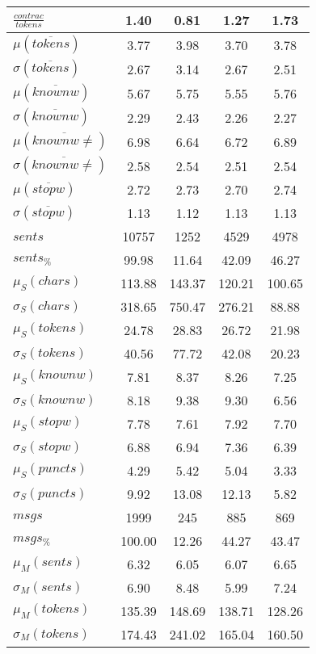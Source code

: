 \begin{table}[h!]
\begin{center}
\begin{tabular}{| l || c | c | c | c |}
$\frac{contrac}{tokens}$ & 1.40  & 0.81  & 1.27  & 1.73 \\\hline\hline
$\mu(\overline{tokens})$ & 3.77  & 3.98  & 3.70  & 3.78 \\
$\sigma(\overline{tokens})$ & 2.67  & 3.14  & 2.67  & 2.51 \\\hline
$\mu(\overline{knownw})$ & 5.67  & 5.75  & 5.55  & 5.76 \\
$\sigma(\overline{knownw})$ & 2.29  & 2.43  & 2.26  & 2.27 \\\hline
$\mu(\overline{knownw \neq})$ & 6.98  & 6.64  & 6.72  & 6.89 \\
$\sigma(\overline{knownw \neq})$ & 2.58  & 2.54  & 2.51  & 2.54 \\\hline
$\mu(\overline{stopw})$ & 2.72  & 2.73  & 2.70  & 2.74 \\
$\sigma(\overline{stopw})$ & 1.13  & 1.12  & 1.13  & 1.13 \\\hline\hline
$sents$ & 10757  & 1252  & 4529  & 4978 \\
$sents_{\%}$ & 99.98  & 11.64  & 42.09  & 46.27 \\\hline
$\mu_S(chars)$ & 113.88  & 143.37  & 120.21  & 100.65 \\
$\sigma_S(chars)$ & 318.65  & 750.47  & 276.21  & 88.88 \\\hline
$\mu_S(tokens)$ & 24.78  & 28.83  & 26.72  & 21.98 \\
$\sigma_S(tokens)$ & 40.56  & 77.72  & 42.08  & 20.23 \\\hline
$\mu_S(knownw)$ & 7.81  & 8.37  & 8.26  & 7.25 \\
$\sigma_S(knownw)$ & 8.18  & 9.38  & 9.30  & 6.56 \\\hline
$\mu_S(stopw)$ & 7.78  & 7.61  & 7.92  & 7.70 \\
$\sigma_S(stopw)$ & 6.88  & 6.94  & 7.36  & 6.39 \\\hline
$\mu_S(puncts)$ & 4.29  & 5.42  & 5.04  & 3.33 \\
$\sigma_S(puncts)$ & 9.92  & 13.08  & 12.13  & 5.82 \\\hline\hline
$msgs$ & 1999  & 245  & 885  & 869 \\
$msgs_{\%}$ & 100.00  & 12.26  & 44.27  & 43.47 \\\hline
$\mu_M(sents)$ & 6.32  & 6.05  & 6.07  & 6.65 \\
$\sigma_M(sents)$ & 6.90  & 8.48  & 5.99  & 7.24 \\\hline
$\mu_M(tokens)$ & 135.39  & 148.69  & 138.71  & 128.26 \\
$\sigma_M(tokens)$ & 174.43  & 241.02  & 165.04  & 160.50 \\\hline

\end{tabular}
\end{center}
\end{table}
